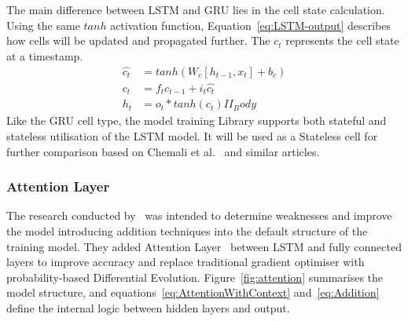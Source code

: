 The main difference between LSTM and GRU lies in the cell state calculation.
Using the same $tanh$ activation function, Equation~\ref{eq:LSTM-output} describes how cells will be updated and propagated further.
The $c_t$ represents the cell state at a timestamp.
\begin{equation}
    \begin{split}
        \hat{c_t} &= tanh \left(W_c \left[h_{t-1}, x_t \right] + b_c \right) \\
              c_t &= f_t c_{t-1}+i_t \hat{c_t} \\
              h_t &= o_t*tanh \left(c_t \right)II_Body
    \end{split}
    \label{eq:LSTM-output}
\end{equation}
Like the GRU cell type, the model training Library supports both stateful and stateless utilisation of the LSTM model.
It will be used as a Stateless cell for further comparison based on Chemali et al.~\cite{Chemali2017} and similar articles.
%
%
\subsubsection{Attention Layer}
The research conducted by~\cite{mamo_long_2020} was intended to determine weaknesses and improve the model introducing addition techniques into the default structure of the training model.
They added Attention Layer~\cite{yang_hierarchical_2016} between LSTM and fully connected layers to improve accuracy and replace traditional gradient optimiser with probability-based Differential Evolution.
Figure~\ref{fig:attention} summarises the model structure, and equations~\ref{eq:AttentionWithContext} and~\ref{eq:Addition} define the internal logic between hidden layers and output.

